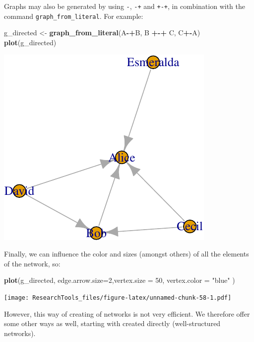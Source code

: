 \documentclass[]{article}
\newenvironment{Shaded}{\begin{snugshade}}{\end{snugshade}}
\newcommand{\KeywordTok}[1]{\textcolor[rgb]{0.13,0.29,0.53}{\textbf{#1}}}
\newcommand{\DataTypeTok}[1]{\textcolor[rgb]{0.13,0.29,0.53}{#1}}
\newcommand{\DecValTok}[1]{\textcolor[rgb]{0.00,0.00,0.81}{#1}}
\newcommand{\StringTok}[1]{\textcolor[rgb]{0.31,0.60,0.02}{#1}}
\newcommand{\OperatorTok}[1]{\textcolor[rgb]{0.81,0.36,0.00}{\textbf{#1}}}
\newcommand{\NormalTok}[1]{#1}
\theoremstyle{definition}
\theoremstyle{definition}
\theoremstyle{definition}
\theoremstyle{remark}
\begin{document}
Graphs may also be generated by using \texttt{-}, \texttt{-+} and
\texttt{+-+}, in combination with the command
\texttt{graph\_from\_literal}. For example:

\begin{Shaded}
\begin{Highlighting}[]
\NormalTok{g_directed <-}\StringTok{ }\KeywordTok{graph_from_literal}\NormalTok{(A}\OperatorTok{-+}\NormalTok{B, B }\OperatorTok{+-+}\StringTok{ }\NormalTok{C, C}\OperatorTok{+-}\NormalTok{A)}
\KeywordTok{plot}\NormalTok{(g_directed)}
\end{Highlighting}
\end{Shaded}

\includegraphics{ResearchTools_files/figure-latex/unnamed-chunk-57-1.pdf}

Finally, we can influence the color and sizes (amongst others) of all
the elements of the network, so:

\begin{Shaded}
\begin{Highlighting}[]
\KeywordTok{plot}\NormalTok{(g_directed, }\DataTypeTok{edge.arrow.size=}\DecValTok{2}\NormalTok{,}\DataTypeTok{vertex.size =} \DecValTok{50}\NormalTok{, }\DataTypeTok{vertex.color =} \StringTok{"blue"}\NormalTok{ )}
\end{Highlighting}
\end{Shaded}

\texttt{[image: ResearchTools\_files/figure-latex/unnamed-chunk-58-1.pdf]}

However, this way of creating of networks is not very efficient. We
therefore offer some other ways as well, starting with created directly
(well-structured networks).
\end{document}
